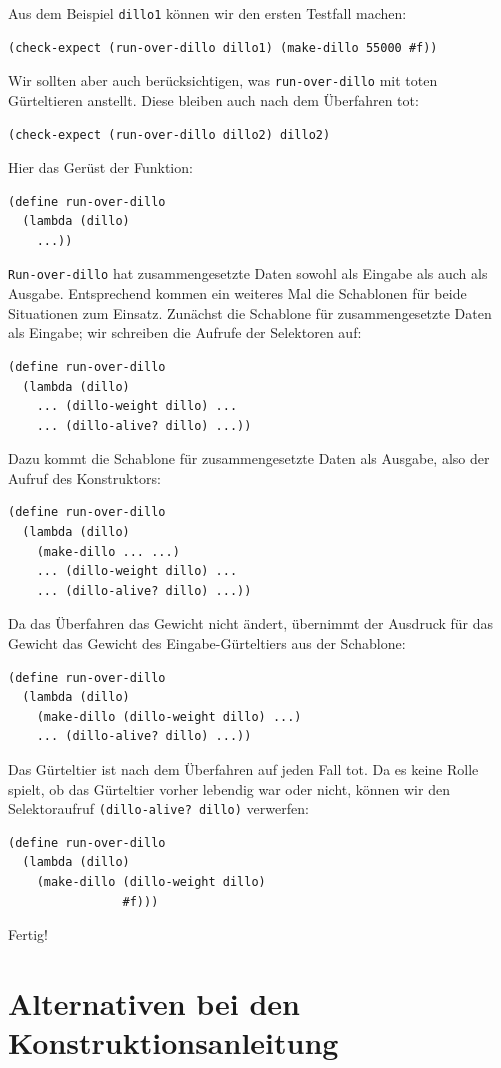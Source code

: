 %
Aus dem Beispiel \texttt{dillo1} können wir den ersten Testfall machen:
%
\begin{verbatim}
(check-expect (run-over-dillo dillo1) (make-dillo 55000 #f))
\end{verbatim}
%
Wir sollten aber auch berücksichtigen, was \texttt{run-over-dillo} mit
toten Gürteltieren anstellt.  Diese bleiben auch nach dem Überfahren
tot:
%
\begin{verbatim}
(check-expect (run-over-dillo dillo2) dillo2)
\end{verbatim}
%
Hier das Gerüst der Funktion:
%
\begin{verbatim}
(define run-over-dillo
  (lambda (dillo)
    ...))
\end{verbatim}
%
\texttt{Run-over-dillo} hat zusammengesetzte Daten sowohl als Eingabe
als auch als Ausgabe.  Entsprechend kommen ein weiteres Mal die
Schablonen für beide Situationen zum Einsatz.  Zunächst die Schablone
für zusammengesetzte Daten als Eingabe; wir schreiben die Aufrufe der
Selektoren auf:
%
\begin{verbatim}
(define run-over-dillo
  (lambda (dillo)
    ... (dillo-weight dillo) ...
    ... (dillo-alive? dillo) ...))
\end{verbatim}
%
Dazu kommt die Schablone für zusammengesetzte Daten als Ausgabe, also
der Aufruf des Konstruktors:
%
\begin{verbatim}
(define run-over-dillo
  (lambda (dillo)
    (make-dillo ... ...)
    ... (dillo-weight dillo) ...
    ... (dillo-alive? dillo) ...))
\end{verbatim}
%
Da das Überfahren das Gewicht nicht ändert, übernimmt
der Ausdruck für das Gewicht das Gewicht des Eingabe-Gürteltiers aus
der Schablone:
%
\begin{verbatim}
(define run-over-dillo
  (lambda (dillo)
    (make-dillo (dillo-weight dillo) ...)
    ... (dillo-alive? dillo) ...))
\end{verbatim}
%
Das Gürteltier ist nach dem Überfahren auf jeden Fall tot.  Da es
keine Rolle spielt, ob das Gürteltier vorher lebendig war oder nicht,
können wir den Selektoraufruf \texttt{(dillo-alive? dillo)} verwerfen:
%
\begin{verbatim}
(define run-over-dillo
  (lambda (dillo)
    (make-dillo (dillo-weight dillo)
                #f)))
\end{verbatim}
%
Fertig!

\section{Alternativen bei den Konstruktionsanleitung}

